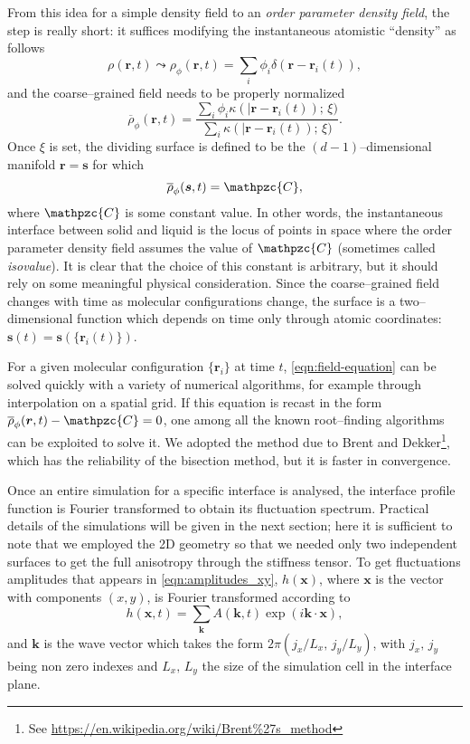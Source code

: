 From this idea for a simple density field to an \textit{order parameter density field}, the step is really short: it suffices modifying the instantaneous atomistic ``density'' as follows
\begin{equation}
\label{eqn:op-field1}
    \rho(\bm{r},t) \leadsto \rho_{\phi}(\bm{r},t)=\sum_i \phi_i \delta(\bm{r}-\bm{r}_i(t)),
\end{equation}
and the coarse--grained field needs to be properly normalized
\begin{equation}
\label{eqn:op-field2}
    \overline{\rho}_{\phi}(\bm{r},t)= \frac{\sum_i \phi_i \kappa(\lvert \bm{r}-\bm{r}_i(t));\,\xi)}{\sum_i \kappa(\lvert \bm{r}-\bm{r}_i(t));\,\xi)}.
\end{equation}
Once $\xi$ is set, the dividing surface is defined to be the $(d-1)$--dimensional manifold $\bm{r}=\bm{s}$ for which
\begin{equation}
\label{eqn:field-equation}
     \overline{\rho}_{\phi}(\bm{s},t)=\mathpzc{C},
\end{equation}
where $\mathpzc{C}$ is some constant value. In other words, the instantaneous interface between solid and liquid is the locus of points in space where the order parameter density field assumes the value of $\mathpzc{C}$ (sometimes called \textit{isovalue}). It is clear that the choice of this constant is arbitrary, but it should rely on some meaningful physical consideration. Since the coarse--grained field changes with time as molecular configurations change, the surface is a two--dimensional function which depends on time only through atomic coordinates: $\bm{s}(t)=\bm{s}(\{\bm{r}_i(t)\})$.

For a given molecular configuration $\{\bm{r}_i\}$ at time $t$, \cref{eqn:field-equation} can be solved quickly with a variety of numerical algorithms, for example through interpolation on a spatial grid. If this equation is recast in the form $ \overline{\rho}_{\phi}(\bm{r},t)-\mathpzc{C}=0$, one among all the known root--finding algorithms can be exploited to solve it. We adopted the method due to Brent and Dekker\footnote{See {\ttfamily\url{https://en.wikipedia.org/wiki/Brent\%27s_method}}}, which has the reliability of the bisection method, but it is faster in convergence. 

Once an entire simulation for a specific interface is analysed, the interface profile function is Fourier transformed to obtain its fluctuation spectrum. Practical details of the simulations will be given in the next section; here it is sufficient to note that we employed the 2D geometry so that we needed only two independent surfaces to get the full anisotropy through the stiffness tensor. To get fluctuations amplitudes that appears in \cref{eqn:amplitudes_xy}, $h(\bm{x})$, where $\bm{x}$ is the vector with components $(x,y)$, is Fourier transformed according to
\begin{equation}
\label{eqn:FT}
    h(\bm{x},t)=\sum_{\bm{k}} A(\bm{k},t) \exp{(i\bm{k}\cdot\bm{x})}, 
\end{equation}
and $\bm{k}$ is the wave vector which takes the form $2\pi(j_x/L_x,\,j_y/L_y)$, with $j_x,\,j_y$ being non zero indexes and $L_x,\,L_y$ the size of the simulation cell in the interface plane.

